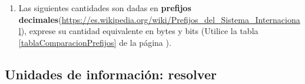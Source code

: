 \documentclass[12pt]{article}
\begin{document}
\begin{enumerate}

    \item Las siguientes cantidades son dadas en \textbf{prefijos
        decimales}(\url{https://es.wikipedia.org/wiki/Prefijos_del_Sistema_Internacional}),
        exprese su cantidad equivalente en bytes y bits  (Utilice la tabla
        \ref{tablaComparacionPrefijos} de la página
        \pageref{tablaComparacionPrefijos}).


\end{enumerate}

\subsection{Unidades de información: resolver}
\end{document}
